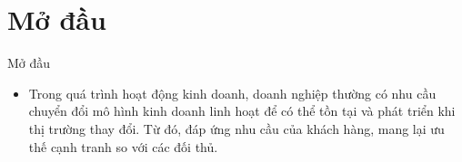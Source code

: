 \section{Mở đầu}
\begin{frame}{Mở đầu}
\begin{itemize}
\item Trong quá trình hoạt động kinh doanh, doanh nghiệp thường có nhu cầu chuyển đổi mô hình kinh doanh linh hoạt để có thể tồn tại và phát triển khi thị trường thay đổi. Từ đó, đáp ứng nhu cầu của khách hàng, mang lại ưu thế cạnh tranh so với các đối thủ.
\end{itemize}
\end{frame}
